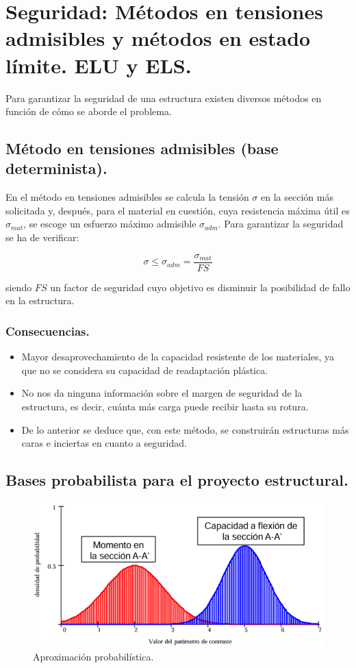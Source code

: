 \section{Seguridad: Métodos en tensiones admisibles y métodos en estado límite. ELU y ELS.}
Para garantizar la seguridad de una estructura existen diversos métodos en función de cómo se aborde el problema.

\subsection{Método en tensiones admisibles (base determinista).}
En el método en tensiones admisibles se calcula la tensión $\sigma$ en la sección más solicitada y, después, para el material en cuestión, cuya resistencia máxima útil es $\sigma_{mat}$, se escoge un esfuerzo máximo admisible $\sigma_{adm}$. Para garantizar la seguridad se ha de verificar:

\begin{equation}
    \sigma \leq \sigma_{adm} = \frac{\sigma_{mat}}{FS}
\end{equation}

siendo $FS$ un factor de seguridad cuyo objetivo es disminuir la posibilidad de fallo en la estructura.

\subsubsection{Consecuencias.}
\begin{itemize}
    \item Mayor desaprovechamiento de la capacidad resistente de los materiales, ya que no se considera su capacidad de readaptación plástica.
    \item No nos da ninguna información sobre el margen de seguridad de la estructura, es decir, cuánta más carga puede recibir hasta su rotura.
    \item De lo anterior se deduce que, con este método, se construirán estructuras más caras e inciertas en cuanto a seguridad.
\end{itemize}

\subsection{Bases probabilista para el proyecto estructural.}

\begin{figure}[h]
    \centering
    \includegraphics[width=0.75\linewidth]{Imagenes/Aproximacion probabilistica.png}
    \caption{Aproximación probabilística.}
\end{figure}

